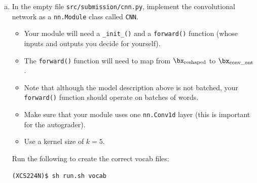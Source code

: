 \begin{enumerate}[(a)]
    \item \label{qn:cnn}
    In the empty file \texttt{src/submission/cnn.py}, implement the convolutional network as a \texttt{nn.Module} class called \texttt{CNN}.
    \begin{itemize}
        \item Your module will need a \texttt{\_init\_()} and a \texttt{forward()} function (whose inputs and outputs you decide for yourself).
        \item The \texttt{forward()} function will need to map from $\bx_\text{reshaped}$ to $\bx_\text{conv\_out}$.
        \item Note that although the model description above is not batched, your \texttt{forward()} function should operate on batches of words.
        \item Make sure that your module uses one \texttt{nn.Conv1d} layer (this is important for the autograder).
        \item Use a kernel size of $k=5$.
    \end{itemize}

Run the following to create the correct vocab files:
\begin{lstlisting}
(XCS224N)$ sh run.sh vocab
\end{lstlisting}


\end{enumerate}
